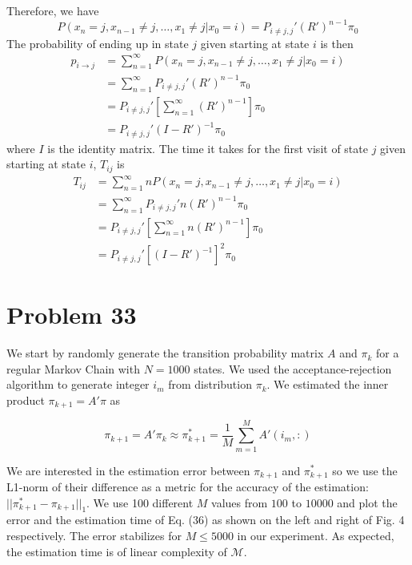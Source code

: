 \documentclass[a4paper, 11pt]{article}
\begin{document}
Therefore, we have 
\begin{equation}
P(x_n = j, x_{n-1} \neq j, \dots, x_1 \neq j | x_0 = i) = P_{i\neq j, j}' (R')^{n-1} \pi_0
\end{equation}
The probability of ending up in state $j$ given starting at state $i$ is then 
\begin{equation}
\begin{split}
p_{i\to j} & = \sum_{n=1}^{\infty} P(x_n = j, x_{n-1} \neq j, \dots, x_1 \neq j | x_0 = i)\\
 & = \sum_{n=1}^{\infty} P_{i\neq j, j}' (R')^{n-1} \pi_0 \\
 & = P_{i\neq j, j}' \left[ \sum_{n=1}^{\infty} (R')^{n-1} \right]\pi_0 \\
 & = P_{i\neq j, j}' (I - R')^{-1} \pi_0
\end{split}
\end{equation}
where $I$ is the identity matrix. The time it takes for the first visit of state $j$ given starting at state $i$, $T_{ij}$ is
\begin{equation}
\begin{split}
T_{ij} & = \sum_{n=1}^{\infty} n P(x_n = j, x_{n-1} \neq j, \dots, x_1 \neq j | x_0 = i)\\
 & = \sum_{n=1}^{\infty} P_{i\neq j, j}' n(R')^{n-1} \pi_0 \\
 & = P_{i\neq j, j}' \left[ \sum_{n=1}^{\infty} n(R')^{n-1} \right] \pi_0 \\
 & = P_{i\neq j, j}' \left[ (I - R')^{-1} \right]^2 \pi_0
\end{split}
\end{equation}


\section*{Problem 33}


We start by randomly generate the transition probability matrix $A$ and $\pi_k$ for a regular Markov Chain with $N=1000$ states. We used the acceptance-rejection algorithm to generate integer $i_m$ from distribution $\pi_k$. We estimated the inner product $\pi_{k+1} = A'\pi$ as 

\begin{equation}
\pi_{k+1} = A'\pi_k \approx \pi^*_{k+1} = \frac{1}{M}\sum_{m=1}^M A'(i_m, :)
\end{equation} 

We are interested in the estimation error between $\pi_{k+1}$ and $\pi^*_{k+1}$ so we use the L1-norm of their difference as a metric for the accuracy of the estimation: $||\pi^*_{k+1} - \pi_{k+1}||_1$. We use 100 different $M$ values from $100$ to $10000$ and plot the error and the estimation time of Eq. (36) as shown on the left and right of Fig. 4 respectively. The error stabilizes for $M \leq 5000$ in our experiment. As expected, the estimation time is of linear complexity of $\mathcal{M}$. 
\end{document}
